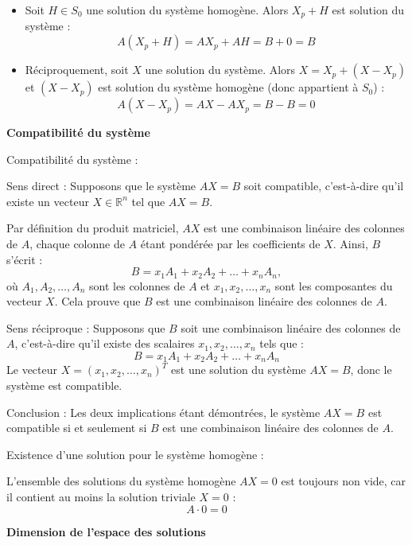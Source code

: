 \documentclass[10pt,a4paper]{article}
\begin{document}
\begin{itemize}
    \item  Soit $H \in S_0$ une solution du système homogène. Alors $X_p + H$ est solution du
    système : $$ A(X_p + H) = AX_p + AH = B + 0 = B $$
    \item Réciproquement, soit $X$ une solution du système. Alors $X = X_p + (X - X_p)$ et $(X -
    X_p)$ est solution du système homogène (donc appartient à $S_0$) : $$ A(X - X_p) = AX - AX_p = B
    - B = 0 $$
\end{itemize}

\bigskip
\textbf{Compatibilité du système}

\q Compatibilité du système :

Sens direct : Supposons que le système \( AX = B \) soit compatible, c'est-à-dire qu'il existe un
vecteur \( X \in \mathbb{R}^n \) tel que \( AX = B \).

Par définition du produit matriciel, \( AX \) est une combinaison linéaire des colonnes de \( A \),
chaque colonne de \( A \) étant pondérée par les coefficients de \( X \). Ainsi, \( B \) s'écrit :
\[
B = x_1 A_1 + x_2 A_2 + \dots + x_n A_n,
\]
où \( A_1, A_2, \dots, A_n \) sont les colonnes de \( A \) et \( x_1, x_2, \dots, x_n \) sont les
composantes du vecteur \( X \). Cela prouve que \( B \) est une combinaison linéaire des colonnes de
\( A \).

Sens réciproque : Supposons que \( B \) soit une combinaison linéaire des colonnes de \( A \),
c'est-à-dire qu'il existe des scalaires \( x_1, x_2, \dots, x_n \) tels que :
\[
B = x_1 A_1 + x_2 A_2 + \dots + x_n A_n
\]
Le vecteur \( X = (x_1, x_2, \dots, x_n)^T \) est une solution du système \( AX = B \), donc le
système est compatible.

Conclusion : Les deux implications étant démontrées, le système \( AX = B \) est compatible si et
seulement si \( B \) est une combinaison linéaire des colonnes de \( A \).

\q Existence d'une solution pour le système homogène :

L'ensemble des solutions du système homogène \( AX = 0 \) est toujours non vide, car il contient au
moins la solution triviale \( X = 0 \) :
\[
A \cdot 0 = 0
\]

\bigskip
\textbf{Dimension de l'espace des solutions}
\end{document}
